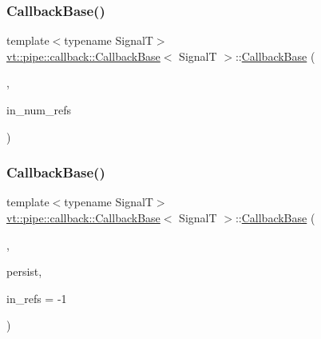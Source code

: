 \mbox{\label{structvt_1_1pipe_1_1callback_1_1_callback_base_a87a0d70f0b3a7c8d94eb62c278ba9e0e}} 
\subsubsection{\texorpdfstring{Callback\+Base()}{CallbackBase()}\hspace{0.1cm}{\footnotesize\ttfamily [6/7]}}
{\footnotesize\ttfamily template$<$typename SignalT$>$ \\
\hyperlink{structvt_1_1pipe_1_1callback_1_1_callback_base}{vt\+::pipe\+::callback\+::\+Callback\+Base}$<$ SignalT $>$\+::\hyperlink{structvt_1_1pipe_1_1callback_1_1_callback_base}{Callback\+Base} (\begin{DoxyParamCaption}\item[{Callback\+Multi\+Use\+Tag\+Type}]{,  }\item[{\hyperlink{namespacevt_a9b39ce9494bb04674d0d5b895a5aa50f}{Ref\+Type} const \&}]{in\+\_\+num\+\_\+refs }\end{DoxyParamCaption})\hspace{0.3cm}{\ttfamily [inline]}}

\mbox{\label{structvt_1_1pipe_1_1callback_1_1_callback_base_a182bd31e2c3f804bb61a4b43907061d2}} 
\subsubsection{\texorpdfstring{Callback\+Base()}{CallbackBase()}\hspace{0.1cm}{\footnotesize\ttfamily [7/7]}}
{\footnotesize\ttfamily template$<$typename SignalT$>$ \\
\hyperlink{structvt_1_1pipe_1_1callback_1_1_callback_base}{vt\+::pipe\+::callback\+::\+Callback\+Base}$<$ SignalT $>$\+::\hyperlink{structvt_1_1pipe_1_1callback_1_1_callback_base}{Callback\+Base} (\begin{DoxyParamCaption}\item[{Callback\+Explicit\+Tag\+Type}]{,  }\item[{bool const \&}]{persist,  }\item[{\hyperlink{namespacevt_a9b39ce9494bb04674d0d5b895a5aa50f}{Ref\+Type} const \&}]{in\+\_\+refs = {\ttfamily -\/1} }\end{DoxyParamCaption})\hspace{0.3cm}{\ttfamily [inline]}}

